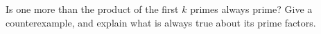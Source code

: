 Is one more than the product of the first $k$ primes always prime? Give a counterexample, and explain what is always true about its prime factors.
